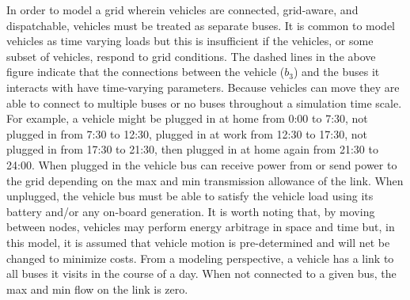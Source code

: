 \documentclass[12pt]{article}
\begin{document}
In order to model a grid wherein vehicles are connected, grid-aware, and dispatchable, vehicles must be treated as separate buses. It is common to model vehicles as time varying loads but this is insufficient if the vehicles, or some subset of vehicles, respond to grid conditions. The dashed lines in the above figure indicate that the connections between the vehicle ($b_3$) and the buses it interacts with have time-varying parameters. Because vehicles can move they are able to connect to multiple buses or no buses throughout a simulation time scale. For example, a vehicle might be plugged in at home from 0:00 to 7:30, not plugged in from 7:30 to 12:30, plugged in at work from 12:30 to 17:30, not plugged in from 17:30 to 21:30, then plugged in at home again from 21:30 to 24:00. When plugged in the vehicle bus can receive power from or send power to the grid depending on the max and min transmission allowance of the link. When unplugged, the vehicle bus must be able to satisfy the vehicle load using its battery and/or any on-board generation. It is worth noting that, by moving between nodes, vehicles may perform energy arbitrage in space and time but, in this model, it is assumed that vehicle motion is pre-determined and will net be changed to minimize costs. From a modeling perspective, a vehicle has a link to all buses it visits in the course of a day. When not connected to a given bus, the max and min flow on the link is zero.




 
\end{document}
